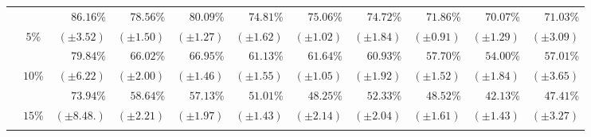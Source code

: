 \begin{table}[!htb]
\begin{center}
{\begin{tabular}{|c|c|r|r|r|r|r|r|r|r|r|}
						\cellcolor{colorTableHeader!15}
							& \cellcolor{colorTableHeader!15}
							& $86.16$\%
							& $78.56$\%
							& $80.09$\%
							& $74.81$\%
							& $75.06$\%
							& $74.72$\%
							& $71.86$\%
							& $70.07$\%
							& $71.03$\%
							\tabularnewline
						\cellcolor{colorTableHeader!15}
							& \multirow{-2}{*}{
								\cellcolor{colorTableHeader!15}
								$5$\%
							}
							& \footnotesize $(\pm3.52)$
							& \footnotesize $(\pm1.50)$
							& \footnotesize $(\pm1.27)$
							& \footnotesize $(\pm1.62)$
							& \footnotesize $(\pm1.02)$
							& \footnotesize $(\pm1.84)$
							& \footnotesize $(\pm0.91)$
							& \footnotesize $(\pm1.29)$
							& \footnotesize $(\pm3.09)$
							\tabularnewline
							\hhline{~----------}
						
						\cellcolor{colorTableHeader!15}
							& \cellcolor{colorTableHeader!15}
							& $79.84$\%
							& $66.02$\%
							& $66.95$\%
							& $61.13$\%
							& $61.64$\%
							& $60.93$\%
							& $57.70$\%
							& $54.00$\%
							& $57.01$\%
							\tabularnewline
						\cellcolor{colorTableHeader!15}
							& \multirow{-2}{*}{
								\cellcolor{colorTableHeader!15}
								$10$\%
							}
							& \footnotesize $(\pm6.22)$
							& \footnotesize $(\pm2.00)$
							& \footnotesize $(\pm1.46)$
							& \footnotesize $(\pm1.55)$
							& \footnotesize $(\pm1.05)$
							& \footnotesize $(\pm1.92)$
							& \footnotesize $(\pm1.52)$
							& \footnotesize $(\pm1.84)$
							& \footnotesize $(\pm3.65)$
							\tabularnewline
							\hhline{~----------}
						
						\cellcolor{colorTableHeader!15}
							& \cellcolor{colorTableHeader!15}
							& $73.94$\%
							& $58.64$\%
							& $57.13$\%
							& $51.01$\%
							& $48.25$\%
							& $52.33$\%
							& $48.52$\%
							& $42.13$\%
							& $47.41$\%
							\tabularnewline
						\cellcolor{colorTableHeader!15}
							& \multirow{-2}{*}{
								\cellcolor{colorTableHeader!15}
								$15$\%
							}
							& \footnotesize $(\pm8.48.)$
							& \footnotesize $(\pm2.21)$
							& \footnotesize $(\pm1.97)$
							& \footnotesize $(\pm1.43)$
							& \footnotesize $(\pm2.14)$
							& \footnotesize $(\pm2.04)$
							& \footnotesize $(\pm1.61)$
							& \footnotesize $(\pm1.43)$
							& \footnotesize $(\pm3.27)$
							\tabularnewline
							\hhline{~----------}
						

\end{tabular}}
\end{center}
\end{table}
